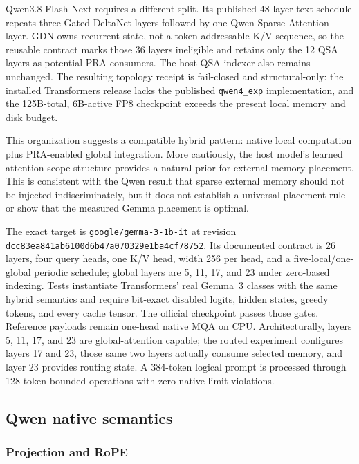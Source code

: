 \documentclass[11pt]{article}
\begin{document}
Qwen3.8 Flash Next requires a different split. Its published 48-layer text schedule repeats three
Gated DeltaNet layers followed by one Qwen Sparse Attention layer. GDN owns recurrent state, not a
token-addressable K/V sequence, so the reusable contract marks those 36 layers ineligible and
retains only the 12 QSA layers as potential PRA consumers. The host QSA indexer also remains
unchanged. The resulting topology receipt is fail-closed and structural-only: the installed
Transformers release lacks the published \texttt{qwen4\_exp} implementation, and the 125B-total,
6B-active FP8 checkpoint exceeds the present local memory and disk budget.

This organization suggests a compatible hybrid pattern: native local computation plus
PRA-enabled global integration. More cautiously, the host model's learned attention-scope
structure provides a natural prior for external-memory placement. This is consistent with the
Qwen result that sparse external memory should not be injected indiscriminately, but it does not
establish a universal placement rule or show that the measured Gemma placement is optimal.

The exact target is \texttt{google/gemma-3-1b-it} at revision
\texttt{dcc83ea841ab6100d6b47a070329e1ba\allowbreak4cf78752}. Its documented contract is 26 layers,
four query heads, one K/V head, width 256 per head, and a five-local/one-global periodic schedule;
global layers are 5, 11, 17, and 23 under zero-based indexing. Tests instantiate Transformers'
real Gemma~3 classes with the same hybrid semantics and require bit-exact disabled logits, hidden
states, greedy tokens, and every cache tensor. The official checkpoint passes those gates.
Reference payloads remain one-head native MQA on CPU. Architecturally, layers 5, 11, 17, and 23
are global-attention capable; the routed experiment configures layers 17 and 23, those same two
layers actually consume selected memory, and layer 23 provides routing state. A 384-token logical prompt is processed
through 128-token bounded operations with zero native-limit violations.

\subsection{Qwen native semantics}

\subsubsection{Projection and RoPE}
\end{document}
